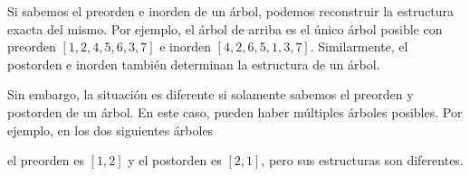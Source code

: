 Si sabemos el preorden e inorden de un árbol, podemos reconstruir la
estructura exacta del mismo. Por ejemplo, el árbol de arriba es el único
árbol posible con preorden $[1,2,4,5,6,3,7]$ e inorden $[4,2,6,5,1,3,7]$.
Similarmente, el postorden e inorden también determinan la estructura
de un árbol.

Sin embargo, la situación es diferente si solamente sabemos el preorden
y postorden de un árbol. En este caso, pueden haber múltiples árboles
posibles. Por ejemplo, en los dos siguientes árboles
\begin{center}
\end{center}
el preorden es $[1,2]$ y el postorden es $[2,1]$,
pero sus estructuras son diferentes.
